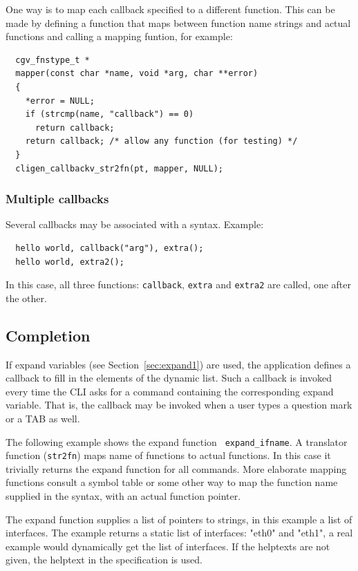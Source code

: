 \documentclass[a4paper, 10pt] {article}
\begin{document}
One way is to map each callback specified to a different
function. This can be made by defining a function that maps between
function name strings and actual functions and calling a mapping
funtion, for example:
\begin{verbatim}
  cgv_fnstype_t *
  mapper(const char *name, void *arg, char **error)
  {
    *error = NULL;
    if (strcmp(name, "callback") == 0)
      return callback;
    return callback; /* allow any function (for testing) */
  }
  cligen_callbackv_str2fn(pt, mapper, NULL);
\end{verbatim}

\subsubsection{Multiple callbacks}
Several callbacks may be associated with a syntax. Example:
\begin{verbatim}
  hello world, callback("arg"), extra();
  hello world, extra2();
\end{verbatim}
In this case, all three functions: {\tt callback}, {\tt extra} and {\tt extra2} are called, one after the other.

\subsection{Completion}
\label{sec:expand}

If expand variables (see Section~\ref{sec:expand1}) are used, the
application defines a callback to fill in the elements of the dynamic
list. Such a callback is invoked every time the CLI asks for a command
containing the corresponding expand variable. That is, the callback
may be invoked when a user types a question mark or a TAB as well.

The following example shows the expand function {\tt
  expand\_ifname}. A translator function ({\tt str2fn}) maps name of
functions to actual functions. In this case it trivially returns the
expand function for all commands. More elaborate mapping functions
consult a symbol table or some other way to map the function name
supplied in the syntax, with an actual function pointer.

The expand function supplies a list of pointers to strings, in this
example a list of interfaces. The example returns a static list of
interfaces: "eth0" and "eth1", a real example would dynamically get
the list of interfaces. If the helptexts are not given, the helptext
in the specification is used.
\end{document}
